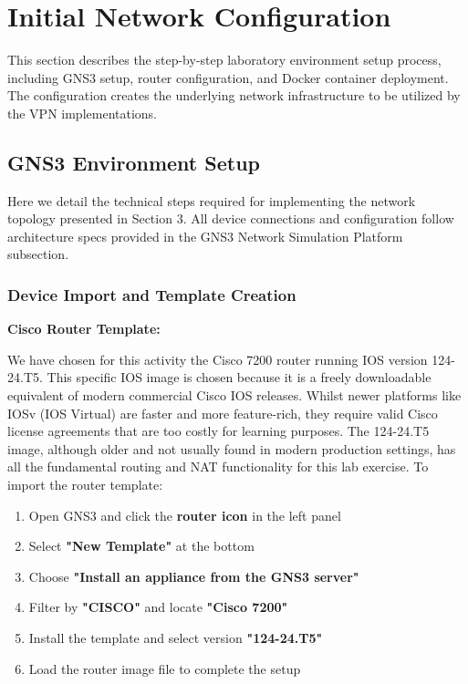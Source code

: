 \newpage

\section{Initial Network Configuration}

This section describes the step-by-step laboratory environment setup process, including GNS3 setup, router configuration, and Docker container deployment. The configuration creates the underlying network infrastructure to be utilized by the VPN implementations.

\subsection{GNS3 Environment Setup}

Here we detail the technical steps required for implementing the network topology presented in Section 3. All device connections and configuration follow architecture specs provided in the GNS3 Network Simulation Platform subsection.

\subsubsection{Device Import and Template Creation}

\textbf{Cisco Router Template:}

\noindent
We have chosen for this activity the Cisco 7200 router running IOS version 124-24.T5. This specific IOS image is chosen because it is a freely downloadable equivalent of modern commercial Cisco IOS releases. Whilst newer platforms like IOSv (IOS Virtual) are faster and more feature-rich, they require valid Cisco license agreements that are too costly for learning purposes. The 124-24.T5 image, although older and not usually found in modern production settings, has all the fundamental routing and NAT functionality for this lab exercise. To import the router template:

\begin{enumerate}
    \item Open GNS3 and click the \textbf{router icon} in the left panel
    \item Select \textbf{"New Template"} at the bottom
    \item Choose \textbf{"Install an appliance from the GNS3 server"}
    \item Filter by \textbf{"CISCO"} and locate \textbf{"Cisco 7200"}
    \item Install the template and select version \textbf{"124-24.T5"}
    \item Load the router image file to complete the setup
\end{enumerate}

